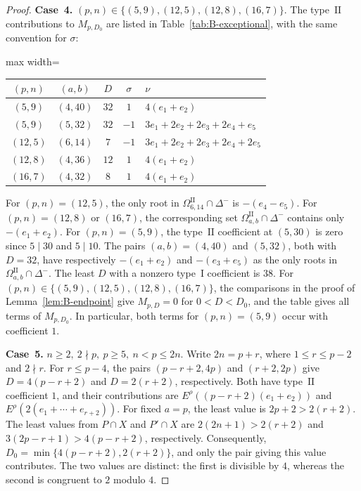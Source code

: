 \documentclass[11pt,a4paper]{amsart}
\theoremstyle{plain}
\numberwithin{equation}{section}
\newenvironment{pf}{\begin{proof}}{\end{proof}}
\begin{document}
\begin{pf}
	\noindent\textbf{Case~4.} \((p,n)\in\{(5,9),(12,5),(12,8),(16,7)\}\).
	The type~\(\mathrm{II}\) contributions to \(M_{p,D_0}\) are listed in Table~\ref{tab:B-exceptional},
	with the same convention for \(\sigma\):
	\begin{center}
\label{tab:B-exceptional}
		\small
		\begin{adjustbox}{max width=\textwidth}
			\begin{tabular}{c|c|c|c|l}
				\((p,n)\)&\((a,b)\)&\(D\)&\(\sigma\)&\(\nu\)\\ \hline
				\((5,9)\)&\((4,40)\)&\(32\)&\(1\)&\(4(e_1+e_2)\)\\
				\((5,9)\)&\((5,32)\)&\(32\)&\(-1\)&\(3e_1+2e_2+2e_3+2e_4+e_5\)\\
				\((12,5)\)&\((6,14)\)&\(7\)&\(-1\)&\(3e_1+2e_2+2e_3+2e_4+2e_5\)\\
				\((12,8)\)&\((4,36)\)&\(12\)&\(1\)&\(4(e_1+e_2)\)\\
				\((16,7)\)&\((4,32)\)&\(8\)&\(1\)&\(4(e_1+e_2)\)
			\end{tabular}
		\end{adjustbox}
	\end{center}
	For \((p,n)=(12,5)\), the only root in
	\(\Omega_{6,14}^{\mathrm{II}}\cap\Delta^-\) is \(-(e_4-e_5)\).
	For \((p,n)=(12,8)\) or \((16,7)\), the corresponding set
	\(\Omega_{a,b}^{\mathrm{II}}\cap\Delta^-\) contains only
	\(-(e_1+e_2)\). For \((p,n)=(5,9)\), the type~\(\mathrm{II}\)
	coefficient at \((5,30)\) is zero since \(5\mid30\) and \(5\mid10\).
	The pairs \((a,b)=(4,40)\) and
	\((5,32)\), both with \(D=32\), have respectively
	\(-(e_1+e_2)\) and \(-(e_3+e_5)\) as the only roots in
	\(\Omega_{a,b}^{\mathrm{II}}\cap\Delta^-\). The least \(D\)
	with a nonzero type~\(\mathrm I\) coefficient is \(38\).
	For \((p,n)\in\{(5,9),(12,5),(12,8),(16,7)\}\), the
	comparisons in the proof of Lemma~\ref{lem:B-endpoint} give
	\(M_{p,D}=0\) for \(0<D<D_0\), and the table gives all terms of
	\(M_{p,D_0}\). In particular, both terms for \((p,n)=(5,9)\)
	occur with coefficient \(1\).
	
	\smallskip
	
	\noindent\textbf{Case~5.} \(n\ge2,\ 2\nmid p,\ p\ge5,\ n<p\le2n\).
	Write \(2n=p+r\), where \(1\le r\le p-2\) and \(2\nmid r\).
	For \(r\le p-4\), the pairs \((p-r+2,4p)\) and \((r+2,2p)\)
	give \(D=4(p-r+2)\) and \(D=2(r+2)\), respectively.
	Both have type~\(\mathrm{II}\) coefficient \(1\), and their
	contributions are \(E^\rho((p-r+2)(e_1+e_2))\) and
	\(E^\rho(2(e_1+\cdots+e_{r+2}))\).
	For fixed \(a=p\), the least value is \(2p+2>2(r+2)\).
	The least values from \(P\cap X\) and \(P'\cap X\) are
	\(2(2n+1)>2(r+2)\) and \(3(2p-r+1)>4(p-r+2)\), respectively.
	Consequently, \(D_0=\min\{4(p-r+2),2(r+2)\}\), and only the
	pair giving this value contributes. The two values are distinct:
	the first is divisible by \(4\), whereas the second is congruent
	to \(2\) modulo \(4\).
	

\end{pf}
\end{document}
